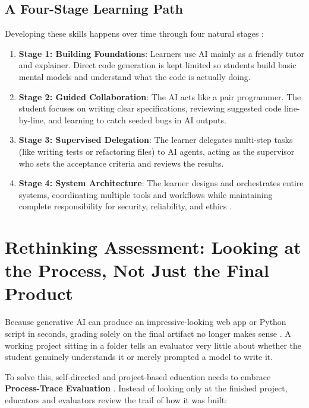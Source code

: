 \documentclass[11pt]{article}
\begin{document}
\subsection{A Four-Stage Learning Path}
Developing these skills happens over time through four natural stages \citep{agenticengineer2026}:
\begin{enumerate}
\item \textbf{Stage 1: Building Foundations}: Learners use AI mainly as a friendly tutor and explainer. Direct code generation is kept limited so students build basic mental models and understand what the code is actually doing.
\item \textbf{Stage 2: Guided Collaboration}: The AI acts like a pair programmer. The student focuses on writing clear specifications, reviewing suggested code line-by-line, and learning to catch seeded bugs in AI outputs.
\item \textbf{Stage 3: Supervised Delegation}: The learner delegates multi-step tasks (like writing tests or refactoring files) to AI agents, acting as the supervisor who sets the acceptance criteria and reviews the results.
\item \textbf{Stage 4: System Architecture}: The learner designs and orchestrates entire systems, coordinating multiple tools and workflows while maintaining complete responsibility for security, reliability, and ethics \citep{emergentagents2026}.
\end{enumerate}

\section{Rethinking Assessment: Looking at the Process, Not Just the Final Product}

Because generative AI can produce an impressive-looking web app or Python script in seconds, grading solely on the final artifact no longer makes sense \citep{zheng2024,lam2021}. A working project sitting in a folder tells an evaluator very little about whether the student genuinely understands it or merely prompted a model to write it.

To solve this, self-directed and project-based education needs to embrace \textbf{Process-Trace Evaluation} \citep{zheng2024,song2026heutagogy}. Instead of looking only at the finished project, educators and evaluators review the trail of how it was built:
\end{document}
